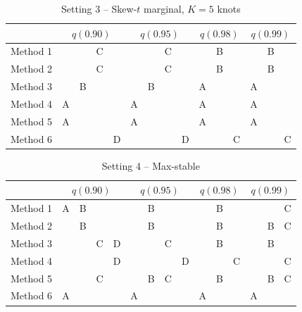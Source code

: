 \documentclass[useAMS,usenatbib,referee]{biomweb}
\begin{document}
\begin{table}[htbp]
  \centering
  \caption{Setting 3 -- Skew-$t$ marginal, $K = 5$ knots}
  \label{sttbl:st5sim}
  \begin{tabular}{|l|cccc|cccc|ccc|ccc|}
    \cline{2-15}
    \multicolumn{1}{c}{} & \multicolumn{4}{|c}{$q(0.90)$} & \multicolumn{4}{|c}{$q(0.95)$} & \multicolumn{3}{|c}{$q(0.98)$} & \multicolumn{3}{|c|}{$q(0.99)$} \\
    \hline
    Method 1 &   &   & C &   &   &   & C &   &   & B &   &   & B &   \\
    \hline
    Method 2 &   &   & C &   &   &   & C &   &   & B &   &   & B &   \\
    \hline
    Method 3 &   & B &   &   &   & B &   &   & A &   &   & A &   &   \\
    \hline
    Method 4 & A &   &   &   & A &   &   &   & A &   &   & A &   &   \\
    \hline
    Method 5 & A &   &   &   & A &   &   &   & A &   &   & A &   &   \\
    \hline
    Method 6 &   &   &   & D &   &   &   & D &   &   & C &   &   & C \\
    \hline
  \end{tabular}
\end{table}

\begin{table}[htbp]
  \centering
  \caption{Setting 4 -- Max-stable}
  \label{sttbl:mssim}
  \begin{tabular}{|l|cccc|cccc|ccc|ccc|}
    \cline{2-15}
    \multicolumn{1}{c}{} & \multicolumn{4}{|c}{$q(0.90)$} & \multicolumn{4}{|c}{$q(0.95)$} & \multicolumn{3}{|c}{$q(0.98)$} & \multicolumn{3}{|c|}{$q(0.99)$} \\
    \hline
    Method 1 & A & B &   &   &   & B &   &   &   & B &   &   &   & C \\
    \hline
    Method 2 &   & B &   &   &   & B &   &   &   & B &   &   & B & C \\
    \hline
    Method 3 &   &   & C & D &   &   & C &   &   & B &   &   & B &   \\
    \hline
    Method 4 &   &   &   & D &   &   &   & D &   &   & C &   &   & C \\
    \hline
    Method 5 &   &   & C &   &   & B & C &   &   & B &   &   & B & C \\
    \hline
    Method 6 & A &   &   &   & A &   &   &   & A &   &   & A &   &   \\
    \hline
  \end{tabular}
\end{table}
\end{document}
